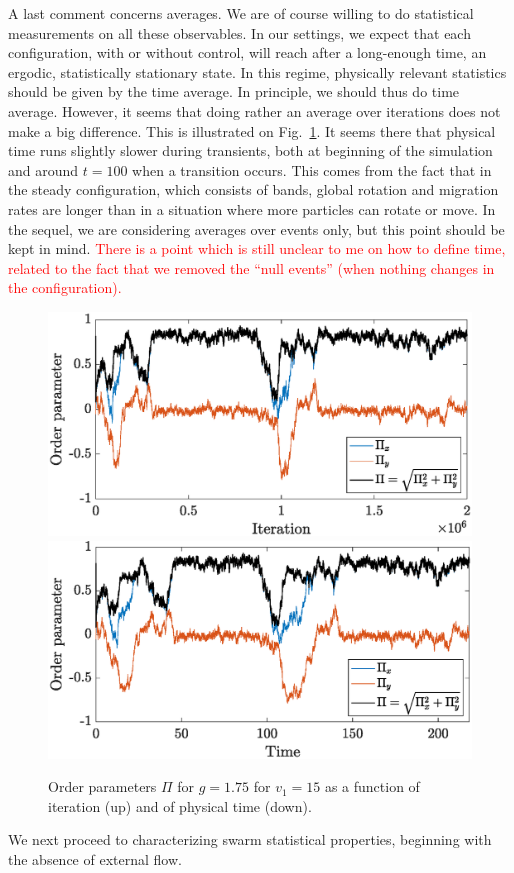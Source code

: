 \documentclass[aps,prl,twocolumn,amsmath,amssymb,superscriptaddress]{revtex4-1}
\newcommand{\obs}[1]{\textcolor{red}{#1}}
\begin{document}
A last comment concerns averages. We are of course willing to do statistical measurements on all these observables. In our settings, we expect that each configuration, with or without control, will reach after a long-enough time, an ergodic, statistically  stationary state. In this regime, physically relevant statistics should be given by the time average. In principle, we should thus do time average. However, it seems that doing rather an average over iterations does not make a big difference. This is illustrated on Fig.~\ref{fig:compare_times}. It seems there that physical time runs slightly slower during transients, both at beginning of the simulation and around $t=100$ when a transition occurs. This comes from the fact that in the steady configuration, which consists of bands, global rotation and migration rates are longer than in a situation where more particles can rotate or move. In the sequel, we are considering averages over events only, but this point should be kept in mind. \obs{There is a point which is still unclear to me on how to define time, related to the fact that we removed the ``null events'' (when nothing changes in the configuration).} 
\begin{figure}[h!]
   \centering
   \includegraphics[width=.38\textwidth]{ord_param_phi_g1.75_v1_15_fn_iter}\\
   \includegraphics[width=.38\textwidth]{ord_param_phi_g1.75_v1_15_fn_time}
   \vspace{-10pt}
   \caption{\label{fig:compare_times} Order parameters $\Pi$ for $g=1.75$ for $v_1=15$ as a function of iteration (up) and of physical time (down).}
\end{figure}

We next proceed to characterizing swarm statistical properties, beginning with the absence of external flow.
\end{document}
